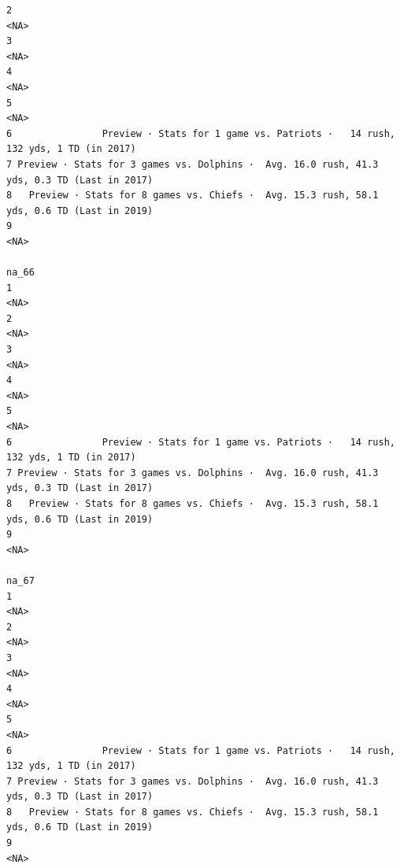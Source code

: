\documentclass[
]{article}
\begin{document}
\begin{verbatim}
2                                                                                        <NA>
3                                                                                        <NA>
4                                                                                        <NA>
5                                                                                        <NA>
6                Preview · Stats for 1 game vs. Patriots ·   14 rush, 132 yds, 1 TD (in 2017)
7 Preview · Stats for 3 games vs. Dolphins ·  Avg. 16.0 rush, 41.3 yds, 0.3 TD (Last in 2017)
8   Preview · Stats for 8 games vs. Chiefs ·  Avg. 15.3 rush, 58.1 yds, 0.6 TD (Last in 2019)
9                                                                                        <NA>
                                                                                        na_66
1                                                                                        <NA>
2                                                                                        <NA>
3                                                                                        <NA>
4                                                                                        <NA>
5                                                                                        <NA>
6                Preview · Stats for 1 game vs. Patriots ·   14 rush, 132 yds, 1 TD (in 2017)
7 Preview · Stats for 3 games vs. Dolphins ·  Avg. 16.0 rush, 41.3 yds, 0.3 TD (Last in 2017)
8   Preview · Stats for 8 games vs. Chiefs ·  Avg. 15.3 rush, 58.1 yds, 0.6 TD (Last in 2019)
9                                                                                        <NA>
                                                                                        na_67
1                                                                                        <NA>
2                                                                                        <NA>
3                                                                                        <NA>
4                                                                                        <NA>
5                                                                                        <NA>
6                Preview · Stats for 1 game vs. Patriots ·   14 rush, 132 yds, 1 TD (in 2017)
7 Preview · Stats for 3 games vs. Dolphins ·  Avg. 16.0 rush, 41.3 yds, 0.3 TD (Last in 2017)
8   Preview · Stats for 8 games vs. Chiefs ·  Avg. 15.3 rush, 58.1 yds, 0.6 TD (Last in 2019)
9                                                                                        <NA>

\end{verbatim}
\end{document}
